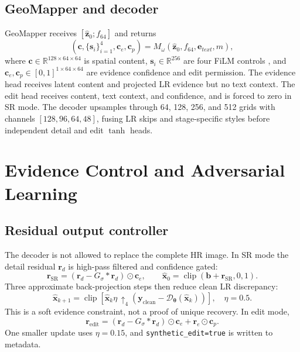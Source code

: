 \documentclass[10pt]{article}
\newcommand{\Dtheta}{\mathcal{D}_{\boldsymbol{\theta}}}
\newcommand{\vect}[1]{\boldsymbol{#1}}
\begin{document}
\subsection{GeoMapper and decoder}
GeoMapper receives $[\hat{\vect{z}}_0;f_{64}]$ and returns
\begin{equation}
 (\vect{c},\{\vect{s}_i\}_{i=1}^{4},\vect{c}_e,\vect{c}_p)
 =M_{\omega}(\hat{\vect{z}}_0,f_{64},\vect{e}_{text},m),
\end{equation}
where $\vect{c}\in\mathbb{R}^{128\times64\times64}$ is spatial content,
$\vect{s}_i\in\mathbb{R}^{256}$ are four FiLM controls \citep{perez2018film}, and
$\vect{c}_e,\vect{c}_p\in[0,1]^{1\times64\times64}$ are evidence confidence and edit permission.
The evidence head receives latent content and projected LR evidence but no text context. The edit
head receives content, text context, and confidence, and is forced to zero in SR mode. The decoder
upsamples through 64, 128, 256, and 512 grids with channels $[128,96,64,48]$, fusing LR skips and
stage-specific styles before independent detail and edit $\tanh$ heads.

\clearpage

\section{Evidence Control and Adversarial Learning}
\subsection{Residual output controller}
The decoder is not allowed to replace the complete HR image. In SR mode the detail residual
$\vect{r}_d$ is high-pass filtered and confidence gated:
\begin{equation}
 \vect{r}_{\mathrm{SR}}=
 \left(\vect{r}_d-G_{\sigma}*\vect{r}_d\right)\odot\vect{c}_e,\qquad
 \hat{\vect{x}}_0=\operatorname{clip}(\vect{b}+\vect{r}_{\mathrm{SR}},0,1).
\end{equation}
Three approximate back-projection steps then reduce clean LR discrepancy:
\begin{equation}
 \hat{\vect{x}}_{k+1}=
 \operatorname{clip}\!\left[
 \hat{\vect{x}}_{k}
 \eta\,\uparrow_4
 \left(\vect{y}_{\mathrm{clean}}-\Dtheta(\hat{\vect{x}}_k)\right)
 \right],
 \quad \eta=0.5.
\end{equation}
This is a soft evidence constraint, not a proof of unique recovery. In edit mode,
\begin{equation}
 \vect{r}_{\mathrm{edit}}=
 \left(\vect{r}_d-G_{\sigma}*\vect{r}_d\right)\odot\vect{c}_e+
 \vect{r}_e\odot\vect{c}_p.
\end{equation}
One smaller update uses $\eta=0.15$, and
\texttt{synthetic\_edit=true} is written to metadata.
\end{document}
